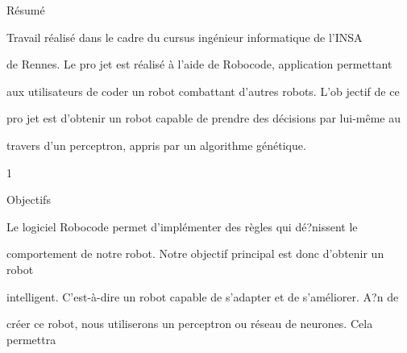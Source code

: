 \documentclass[a4paper,portrait,12pt]{article}
\begin{document}
\begin{flushleft}
R\'{e}sum\'{e}
\end{flushleft}


\begin{flushleft}
Travail r\'{e}alis\'{e} dans le cadre du cursus ing\'{e}nieur informatique de l'INSA
\end{flushleft}


\begin{flushleft}
de Rennes. Le pro jet est r\'{e}alis\'{e} \`{a} l'aide de Robocode, application permettant
\end{flushleft}


\begin{flushleft}
aux utilisateurs de coder un robot combattant d'autres robots. L'ob jectif de ce
\end{flushleft}


\begin{flushleft}
pro jet est d'obtenir un robot capable de prendre des d\'{e}cisions par lui-m\^{e}me au
\end{flushleft}


\begin{flushleft}
travers d'un perceptron, appris par un algorithme g\'{e}n\'{e}tique.
\end{flushleft}





1





\begin{flushleft}
Objectifs
\end{flushleft}





\begin{flushleft}
Le logiciel Robocode permet d'impl\'{e}menter des r\`{e}gles qui d\'{e}?nissent le
\end{flushleft}


\begin{flushleft}
comportement de notre robot. Notre objectif principal est donc d'obtenir un robot
\end{flushleft}


\begin{flushleft}
intelligent. C'est-\`{a}-dire un robot capable de s'adapter et de s'am\'{e}liorer. A?n de
\end{flushleft}


\begin{flushleft}
cr\'{e}er ce robot, nous utiliserons un perceptron ou r\'{e}seau de neurones. Cela permettra
\end{flushleft}
\end{document}
